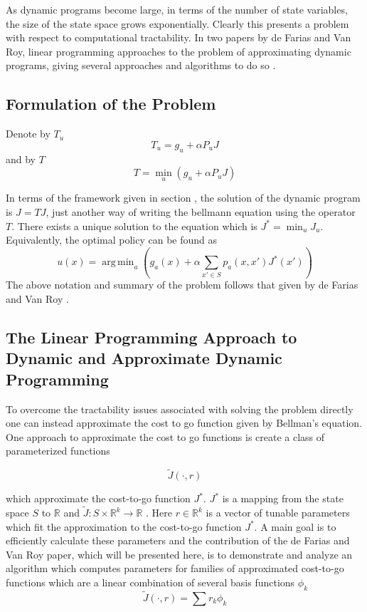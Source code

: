 \documentclass[12pt,reqno]{amsart}
\newcommand{\R}{\ensuremath{\mathbb{R}}}
\numberwithin{equation}{section}
\DeclareMathOperator*{\argmin}{arg\,min}
\begin{document}
As dynamic programs become large, in terms of the number of state variables, the size of the state space grows exponentially. Clearly this presents a problem with respect to computational tractability. In two papers by de Farias and Van Roy, linear programming approaches to the problem of approximating dynamic programs, giving several approaches and algorithms to do so \cite{FV} \cite{FV2}.

\subsection{Formulation of the Problem}
Denote by $T_u$
$$
T_u = g_u + \alpha P_uJ
$$
and by $T$
$$
T = \min_u(g_u + \alpha P_uJ)
$$

In terms of the framework given in section , the solution of the dynamic program is $J = TJ$, just another way of writing the bellmann equation using the operator $T$. There exists a unique solution to the equation which is $J^* = \min_u J_u$. Equivalently, the optimal policy can be found as
$$
u(x) = \argmin_a (g_a(x) + \alpha \sum_{x' \in S} p_a(x,x')J^*(x'))
$$
The above notation and summary of the problem follows that given by de Farias and Van Roy \cite{FV}.

\subsection{The Linear Programming Approach to Dynamic and Approximate Dynamic Programming}

To overcome the tractability issues associated with solving the problem directly one can instead approximate the cost to go function given by Bellman's equation. One approach to approximate the cost to go functions is create a class of parameterized functions

$$
\tilde{J}(\cdot,r)
$$

which approximate the cost-to-go function $J^*$. $J^*$ is a mapping from the state space $S$ to $\R$ and $\tilde{J} : S \times \R^k \rightarrow \R$ \cite{FV}. Here $r \in \R^k$ is a vector of tunable parameters which fit the approximation to the cost-to-go function $J^*$. A main goal is to efficiently calculate these parameters and the contribution of the de Farias and Van Roy paper, which will be presented here, is to demonstrate and analyze an algorithm which computes parameters for families of approximated cost-to-go functions which are a linear combination of several basis functions $\phi_k$
$$
\tilde{J}(\cdot,r)  = \sum r_k \phi_k
$$
\end{document}
